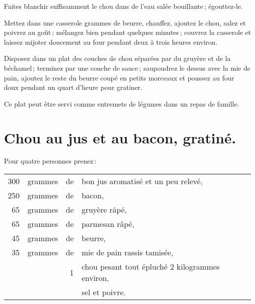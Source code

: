 Faites blanchir suffisamment le chou dans de l'eau salée bouillante ;
égouttez-le.

Mettez dans une casserole {\mmm} grammes de beurre, chauffez, ajoutez le
chou, salez et poivrez au goût ; mélangez bien pendant quelques minutes ;
couvrez la casserole et laissez mijoter doucement au four pendant deux à trois
heures environ.

Disposez dans un plat des couches de chou séparées par du gruyère et de la
béchamel ; terminez par une couche de sauce ; saupoudrez le dessus avec la mie
de pain, ajoutez le reste du beurre coupé en petits morceaux et poussez au four
doux pendant un quart d'heure pour gratiner.

\medskip

Ce plat peut être servi comme entremets de légumes dans un repas de famille.

\section*{\centering Chou au jus et au bacon, gratiné.}
{}

Pour quatre personnes prenez :

\footnotesize
\begin{longtable}{rrrp{16em}}
    300 & grammes & de & bon jus aromatisé et un peu relevé,                                              \\
    250 & grammes & de & bacon,                                                                           \\
     65 & grammes & de & gruyère râpé,                                                                    \\
     65 & grammes & de & parmesan râpé,                                                                   \\
     45 & grammes & de & beurre,                                                                          \\
     35 & grammes & de & mie de pain rassis tamisée,                                                      \\
        &         &  1 & chou pesant tout épluché 2 kilogrammes environ,                                  \\
        &         &    & sel et poivre.                                                                   \\
\end{longtable}
\normalsize


